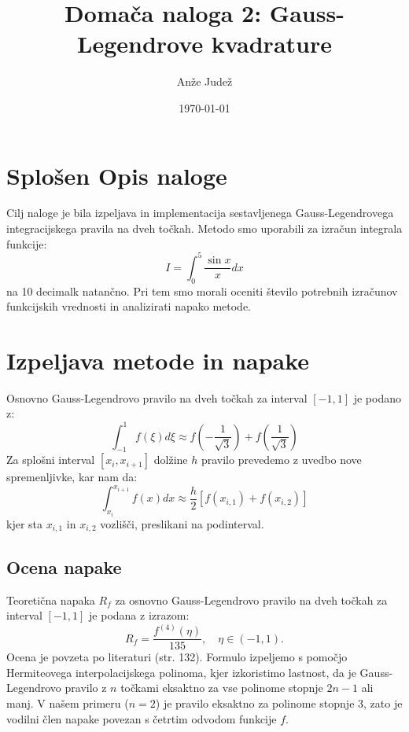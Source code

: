 \documentclass[11pt, a4paper]{article}
\title{Domača naloga 2: Gauss-Legendrove kvadrature}
\author{Anže Judež}
\date{\today}
\begin{document}
\maketitle

\section{Splošen Opis naloge}
Cilj naloge je bila izpeljava in implementacija sestavljenega Gauss-Legendrovega integracijskega pravila na dveh točkah. Metodo smo uporabili za izračun integrala funkcije:
\begin{equation}
    I = \int_{0}^{5} \frac{\sin x}{x} dx
\end{equation}
na 10 decimalk natančno. Pri tem smo morali oceniti število potrebnih izračunov funkcijskih vrednosti in analizirati napako metode.

\section{Izpeljava metode in napake}
Osnovno Gauss-Legendrovo pravilo na dveh točkah za interval $[-1, 1]$ je podano z:
\begin{equation}
    \int_{-1}^{1} f(\xi) d\xi \approx f\left(-\frac{1}{\sqrt{3}}\right) + f\left(\frac{1}{\sqrt{3}}\right)
\end{equation}
Za splošni interval $[x_i, x_{i+1}]$ dolžine $h$ pravilo prevedemo z uvedbo nove spremenljivke, kar nam da:
\begin{equation}
    \int_{x_i}^{x_{i+1}} f(x) dx \approx \frac{h}{2} \left[ f(x_{i,1}) + f(x_{i,2}) \right]
\end{equation}
kjer sta $x_{i,1}$ in $x_{i,2}$ vozlišči, preslikani na podinterval.

\subsection{Ocena napake}
Teoretična napaka $R_f$ za osnovno Gauss-Legendrovo pravilo na dveh točkah za interval $[-1, 1]$ je podana z izrazom:
\begin{equation}
    R_f = \frac{f^{(4)}(\eta)}{135}, \quad \eta \in (-1, 1).
\end{equation}
Ocena je povzeta po literaturi \cite{orel2004} (str. 132). Formulo izpeljemo s pomočjo Hermiteovega interpolacijskega polinoma, kjer izkoristimo lastnost, da je Gauss-Legendrovo pravilo z $n$ točkami eksaktno za vse polinome stopnje $2n-1$ ali manj. V našem primeru ($n=2$) je pravilo eksaktno za polinome stopnje 3, zato je vodilni člen napake povezan s četrtim odvodom funkcije $f$.
\end{document}
